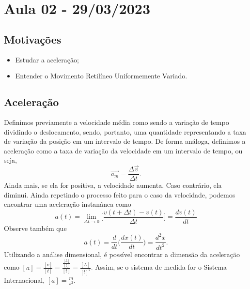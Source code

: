 \documentclass{article}
\begin{document}
\section{Aula 02 - 29/03/2023}
\subsection{Motiva\c c\~oes}
\begin{itemize}
  \item Estudar a acelera\c c\~ao;
  \item Entender o Movimento Retil\'ineo Uniformemente Variado.
\end{itemize}
\subsection{Acelera\c c\~ao}
  Definimos previamente a velocidade m\'edia como sendo a varia\c c\~ao de tempo dividindo o deslocamento, sendo, portanto,
uma quantidade representando a taxa de varia\c c\~ao da posi\c c\~ao em um intervalo de tempo. De forma an\'aloga,
definimos a acelera\c c\~ao como a taxa de varia\c c\~ao da velocidade em um intervalo de tempo, ou seja, 
  $$
    \vec{a_{m}} = \frac{\Delta \vec{v}}{\Delta t}.
  $$
  Ainda mais, se ela for positiva, a velocidade aumenta. Caso contr\'ario, ela diminui. Ainda repetindo o processo feito
para o caso da velocidade, podemos encontrar uma acelera\c c\~ao instan\^anea como 
    $$
      a(t) = \lim_{\Delta t\to0}\biggl[\frac{v(t + \Delta t) - v(t)}{\Delta t}\biggr] = \frac{dv(t)}{dt}
    $$
  Observe tamb\'em que 
    $$
      a(t) = \frac{d}{dt}\biggl(\frac{dx(t)}{dt}\biggr) = \frac{d^{2}x}{dt^{2}}.
    $$
  Utilizando a an\'alise dimensional, \'e poss\'ivel encontrar a dimens\~ao da acelera\c c\~ao como $[a]=\frac{[v]}{[t]} = \frac{\frac{[L]}{[t]}}{[t]} = \frac{[L]}{[t]^{2}}.$ Assim,
se o sistema de medida for o Sistema Internacional, $[a] = \frac{m}{s^{2}}$.

\end{document}
